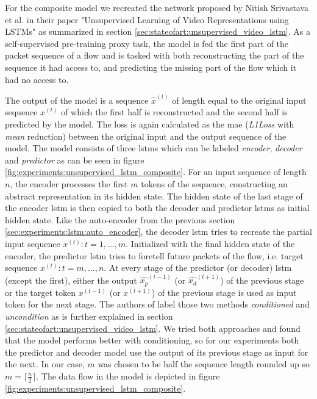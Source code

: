 For the composite model we recreated the network proposed by Nitish Srivastava et al. in their paper "Unsupervised Learning of Video Representations using LSTMs" \cite{unsupervised_learning_lstms} as summarized in section \ref{sec:stateofart:unsupervised_video_lstm}. As a self-supervised pre-training proxy task, the model is fed the first part of the packet sequence of a flow and is tasked with both reconstructing the part of the sequence it had access to, and predicting the missing part of the flow which it had no access to. \par
The output of the model is a sequence $\hat{x}^{(t)}$ of length equal to the original input sequence $x^{(t)}$ of which the first half is reconstructed and the second half is predicted by the model. The loss is again calculated as the \gls{mae} (\textit{L1Loss} with \textit{mean} reduction) between the original input and the output sequence of the model. The model consists of three \glspl{lstm} which can be labeled \textit{encoder}, \textit{decoder} and \textit{predictor} as can be seen in figure \ref{fig:experiments:unsupervised_lstm_composite}. For an input sequence of length $n$, the encoder processes the first $m$ tokens of the sequence, constructing an abstract representation in its hidden state. The hidden state of the last stage of the encoder \gls{lstm} is then copied to both the decoder and predictor \glspl{lstm} as initial hidden state. Like the auto-encoder from the previous section \ref{sec:experiments:lstm:auto_encoder}, the decoder \gls{lstm} tries to recreate the partial input sequence $x^{(t)}: t=1, ..., m$. Initialized with the final hidden state of the encoder, the predictor \gls{lstm} tries to foretell future packets of the flow, i.e. target sequence $x^{(t)}: t=m, ..., n$. At every stage of the predictor (or decoder) \gls{lstm} (except the first), either the output $\hat{x_p}^{(t-1)}$ (or $\hat{x_d}^{(t+1)}$) of the previous stage or the target token $x^{(t-1)}$ (or $x^{(t+1)}$) of the previous stage is used as input token for the next stage. The authors of \cite{unsupervised_learning_lstms} label those two methods \textit{conditioned} and \textit{uncondition} as is further explained in section \ref{sec:stateofart:unsupervised_video_lstm}. We tried both approaches and found that the model performs better with conditioning, so for our experiments both the predictor and decoder model use the output of its previous stage as input for the next. In our case, $m$ was chosen to be half the sequence length rounded up so $m=\lceil \frac{n}{2} \rceil$. The data flow in the model is depicted in figure \ref{fig:experiments:unsupervised_lstm_composite}. 

